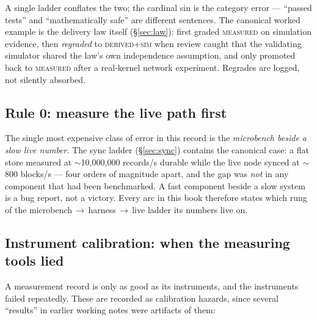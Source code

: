 \documentclass[10pt,a4paper]{article}
\begin{document}
\noindent A single ladder conflates the two; the cardinal sin is the category error ---
``passed tests'' and ``mathematically safe'' are different sentences. The canonical worked
example is the delivery law itself (\S\ref{sec:law}): first graded \textsc{measured} on
simulation evidence, then \emph{regraded} to \textsc{derived+sim} when review caught that
the validating simulator shared the law's own independence assumption, and only promoted
back to \textsc{measured} after a real-kernel network experiment. Regrades are logged, not
silently absorbed.

\subsection{Rule 0: measure the live path first}
\label{sec:rule0}

The single most expensive class of error in this record is the \emph{microbench beside a
slow live number}. The sync ladder (\S\ref{sec:sync}) contains the canonical case: a flat
store measured at $\sim$10{,}000{,}000 records/s durable while the live node synced at
$\sim$800 blocks/s --- four orders of magnitude apart, and the gap was \emph{not} in any
component that had been benchmarked. A fast component beside a slow system is a bug report,
not a victory. Every arc in this book therefore states which rung of the
microbench\,$\to$\,harness\,$\to$\,live ladder its numbers live on.

\subsection{Instrument calibration: when the measuring tools lied}
\label{sec:instruments}

A measurement record is only as good as its instruments, and the instruments failed
repeatedly. These are recorded as calibration hazards, since several ``results'' in
earlier working notes were artifacts of them:
\end{document}

